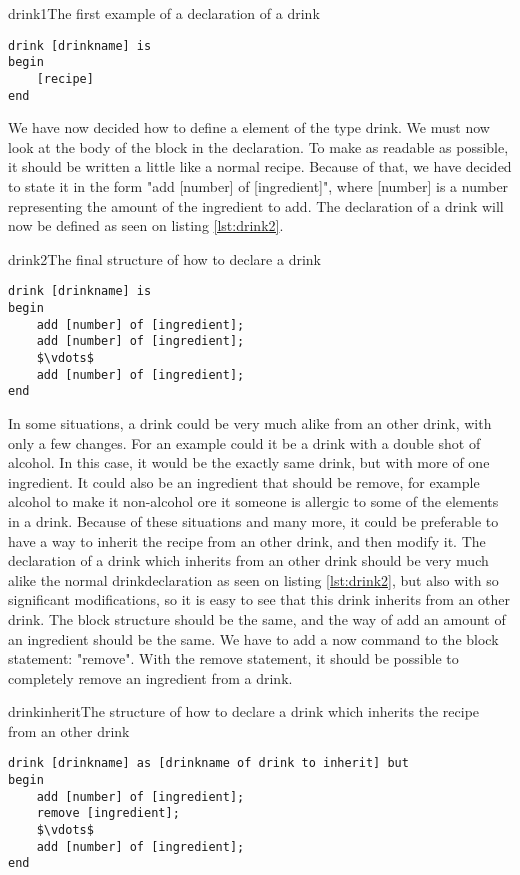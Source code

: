 \begin{code}{drink1}{The first example of a declaration of a drink}
\begin{lstlisting}
drink [drinkname] is
begin
	[recipe]
end
\end{lstlisting}
\end{code}

We have now decided how to define a element of the type drink. We must now look at the body of the block in the declaration. To make as readable as possible, it should be written a little like a normal recipe. Because of that, we have decided to state it in the form "add [number] of [ingredient]", where [number] is a number representing the amount of the ingredient to add. The declaration of a drink will now be defined as seen on listing \ref{lst:drink2}.

\begin{code}{drink2}{The final structure of how to declare a drink}
\begin{lstlisting}[mathescape]
drink [drinkname] is
begin
	add [number] of [ingredient];
	add [number] of [ingredient];
	$\vdots$
	add [number] of [ingredient];
end
\end{lstlisting}
\end{code}

In some situations, a drink could be very much alike from an other drink, with only a few changes. For an example could it be a drink with a double shot of alcohol. In this case, it would be the exactly same drink, but with more of one ingredient. It could also be an ingredient that should be remove, for example alcohol to make it non-alcohol ore it someone is allergic to some of the elements in a drink. Because of these situations and many more, it could be preferable to have a way to inherit the recipe from an other drink, and then modify it. The declaration of a drink which inherits from an other drink should be very much alike the normal drinkdeclaration as seen on listing \ref{lst:drink2}, but also with so significant modifications, so it is easy to see that this drink inherits from an other drink. The block structure should be the same, and the way of add an amount of an ingredient should be the same. We have to add a now command to the block statement: "remove". With the remove statement, it should be possible to completely remove an ingredient from a drink.

\begin{code}{drinkinherit}{The structure of how to declare a drink which inherits the recipe from an other drink}
\begin{lstlisting}[mathescape]
drink [drinkname] as [drinkname of drink to inherit] but
begin
	add [number] of [ingredient];
	remove [ingredient];
	$\vdots$
	add [number] of [ingredient];
end
\end{lstlisting}
\end{code}

